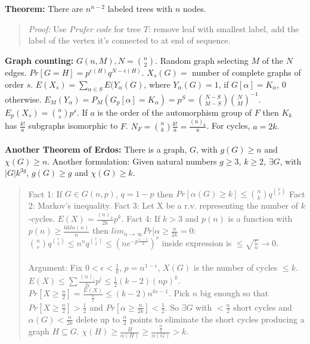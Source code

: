 \\
\\
{\bf Theorem:} There are $n^{n-2}$ labeled trees with $n$ nodes.  
\begin{quote}
\emph{Proof:} Use \emph{Prufer code} for tree $T$: remove leaf with smallest
label, add the label of the vertex it's connected to at end of sequence.
\end{quote}
{\bf Graph counting:}
$G(n, M), N= {n \choose 2}$.  Random graph selecting  $M$ of the $N$ edges.
$Pr[G=H]= p^{e(H)} q^{N-e(H)}$.
$X_s (G)= $ number of complete graphs of order $s$.
$E(X_s )=  \sum_{\alpha \in S}  E( Y_{\alpha} (G)$, where
$Y_{\alpha} (G) = 1$, if $G[ \alpha ] = K_{\alpha}$, $0$ otherwise.
$E_M (Y_{\alpha} )= P_M (G_p [ \alpha ]= K_{\alpha})= p^S =
{{N-S} \choose {M-S}} {N \choose M}^{-1}$.
$E_p ( X_s )= {n \choose s} p^s$.
If $a$ is the order of the automorphism group of $F$ then $K_k$ has
${\frac {k!} {a}}$ subgraphs isomorphic to $F$.
$N_F = {n \choose k} {\frac {k!} {a}}= {\frac {(n)_k} {a}}$.
For cycles, $a= 2k$.
\\
\\
{\bf Another Theorem of Erdos:}  There is a graph, $G$, with $g(G) \geq n$ and
$\chi (G) \geq n$.  Another formulation:  Given natural numbers 
$g \geq 3$,
$k \geq 2$, $\exists G$, with $|G| k^{3g}$, $g(G) \geq g$
and $\chi (G) \geq k$.
\begin{quote}
Fact 1: If $G \in G(n, p)$, $q= 1-p$ then
$Pr[ \alpha (G) \geq k ] \leq  {{n} \choose {k}} q^{{k} \choose {2}}$
Fact 2: Markov's inequality.
Fact 3: Let X be a r.v. representing the number of $k$-cycles.
$E(X) = {\frac {(n)_k} {2k}} p^k$.
Fact 4: If $k>3$ and $p(n)$ is a function with
$p(n) \geq {\frac {6 k ln(n) } {n} }$ then
$lim_{n \rightarrow \infty} Pr [ \alpha \geq {\frac {n} {2k}} = 0$:
${{n} \choose {r}} q^{{r} \choose {2}} \leq n^n q^{{r} \choose {2}} \leq
{(n e^{- p {\frac {r-1} {2}}})^r}$ inside expression is
$\leq {\sqrt {\frac {e} {n}}} \rightarrow 0$.
\\
\\
Argument:  Fix $ 0 < \epsilon < {\frac {1} {k}}$, $p= n^{1- \epsilon}$,
$X(G)$ is the number of cycles $\leq k$.  $E(X) \leq \sum
{\frac {(n)_i} {2i}} p^i \leq {\frac {1} {2}} (k-2) (np)^k$.
$Pr[X \geq {\frac {n} {2}}] = {\frac {E(X)} {\frac {n} {2}}} \leq
(k-2) n^{k \epsilon - 1}$.  Pick $n$ big enough so that
$Pr[X \geq {\frac {n} {2}}] > {\frac {1} {2}}$ and
$Pr[ \alpha \geq {\frac {n} {2k}}] < {\frac {1} {2}}$.  So $\exists G$ with
$<{\frac {n} {2}}$ short cycles and $\alpha(G) < {\frac {n} {2k}}$ delete up
to
${\frac {n} {2}}$ points to eliminate the short cycles producing a graph
$H \subseteq G$.  $\chi (H) \geq {\frac {H} {\alpha (H)}} \geq
{\frac {\frac {n} {2}} {\alpha (G)}} > k$.
\end{quote}

